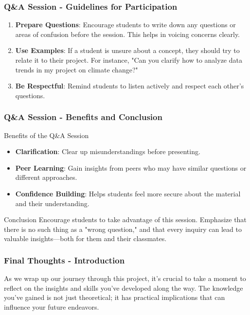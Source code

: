 \documentclass[aspectratio=169]{beamer}
\begin{document}
\begin{frame}[fragile]
    \frametitle{Q\&A Session - Guidelines for Participation}
    \begin{enumerate}
        \item \textbf{Prepare Questions}:
        Encourage students to write down any questions or areas of confusion before the session. This helps in voicing concerns clearly.
        
        \item \textbf{Use Examples}:
        If a student is unsure about a concept, they should try to relate it to their project. For instance, "Can you clarify how to analyze data trends in my project on climate change?"
        
        \item \textbf{Be Respectful}:
        Remind students to listen actively and respect each other’s questions.
    \end{enumerate}
\end{frame}

\begin{frame}[fragile]
    \frametitle{Q\&A Session - Benefits and Conclusion}
    \begin{block}{Benefits of the Q\&A Session}
        \begin{itemize}
            \item \textbf{Clarification}: Clear up misunderstandings before presenting.
            \item \textbf{Peer Learning}: Gain insights from peers who may have similar questions or different approaches.
            \item \textbf{Confidence Building}: Helps students feel more secure about the material and their understanding.
        \end{itemize}
    \end{block}
    
    \begin{block}{Conclusion}
        Encourage students to take advantage of this session. Emphasize that there is no such thing as a "wrong question," and that every inquiry can lead to valuable insights—both for them and their classmates.
    \end{block}
\end{frame}

\begin{frame}[fragile]
    \frametitle{Final Thoughts - Introduction}
    As we wrap up our journey through this project, it's crucial to take a moment to reflect on the insights and skills you've developed along the way. The knowledge you've gained is not just theoretical; it has practical implications that can influence your future endeavors.
\end{frame}
\end{document}

